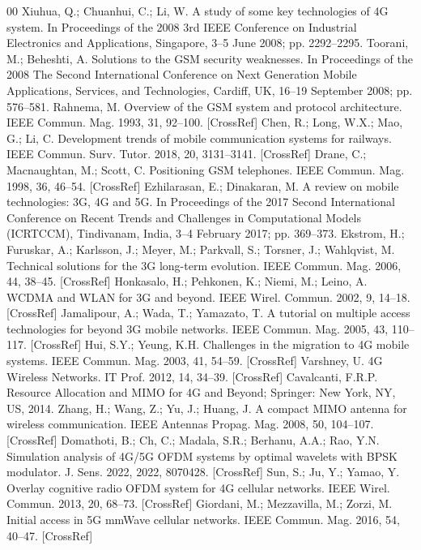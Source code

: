 \documentclass[conference]{IEEEtran}
\begin{document}
\begin{thebibliography}{00}
 Xiuhua, Q.; Chuanhui, C.; Li, W. A study of some key technologies of 4G system. In Proceedings of the 2008 3rd IEEE Conference on Industrial Electronics and Applications, Singapore, 3–5 June 2008; pp. 2292–2295.
 Toorani, M.; Beheshti, A. Solutions to the GSM security weaknesses. In Proceedings of the 2008 The Second International Conference on Next Generation Mobile Applications, Services, and Technologies, Cardiff, UK, 16–19 September 2008; pp. 576–581.
 Rahnema, M. Overview of the GSM system and protocol architecture. IEEE Commun. Mag. 1993, 31, 92–100. [CrossRef]
 Chen, R.; Long, W.X.; Mao, G.; Li, C. Development trends of mobile communication systems for railways. IEEE Commun. Surv. Tutor. 2018, 20, 3131–3141. [CrossRef]
 Drane, C.; Macnaughtan, M.; Scott, C. Positioning GSM telephones. IEEE Commun. Mag. 1998, 36, 46–54. [CrossRef]
 Ezhilarasan, E.; Dinakaran, M. A review on mobile technologies: 3G, 4G and 5G. In Proceedings of the 2017 Second International Conference on Recent Trends and Challenges in Computational Models (ICRTCCM), Tindivanam, India, 3–4 February 2017; pp. 369–373.
 Ekstrom, H.; Furuskar, A.; Karlsson, J.; Meyer, M.; Parkvall, S.; Torsner, J.; Wahlqvist, M. Technical solutions for the 3G long-term evolution. IEEE Commun. Mag. 2006, 44, 38–45. [CrossRef]
 Honkasalo, H.; Pehkonen, K.; Niemi, M.; Leino, A. WCDMA and WLAN for 3G and beyond. IEEE Wirel. Commun. 2002, 9, 14–18. [CrossRef]
 Jamalipour, A.; Wada, T.; Yamazato, T. A tutorial on multiple access technologies for beyond 3G mobile networks. IEEE Commun. Mag. 2005, 43, 110–117. [CrossRef]
 Hui, S.Y.; Yeung, K.H. Challenges in the migration to 4G mobile systems. IEEE Commun. Mag. 2003, 41, 54–59. [CrossRef]
 Varshney, U. 4G Wireless Networks. IT Prof. 2012, 14, 34–39. [CrossRef]
 Cavalcanti, F.R.P. Resource Allocation and MIMO for 4G and Beyond; Springer: New York, NY, US, 2014.
 Zhang, H.; Wang, Z.; Yu, J.; Huang, J. A compact MIMO antenna for wireless communication. IEEE Antennas Propag. Mag. 2008, 50, 104–107. [CrossRef]
 Domathoti, B.; Ch, C.; Madala, S.R.; Berhanu, A.A.; Rao, Y.N. Simulation analysis of 4G/5G OFDM systems by optimal wavelets with BPSK modulator. J. Sens. 2022, 2022, 8070428. [CrossRef]
 Sun, S.; Ju, Y.; Yamao, Y. Overlay cognitive radio OFDM system for 4G cellular networks. IEEE Wirel. Commun. 2013, 20, 68–73. [CrossRef]
 Giordani, M.; Mezzavilla, M.; Zorzi, M. Initial access in 5G mmWave cellular networks. IEEE Commun. Mag. 2016, 54, 40–47. [CrossRef]

\end{thebibliography}
\end{document}
